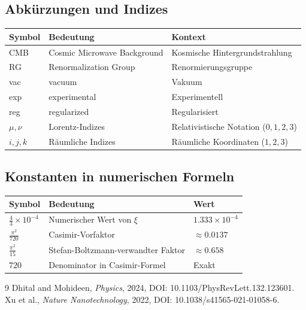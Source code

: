 	\subsection{Abkürzungen und Indizes}
	\begin{longtable}{>{\raggedright\arraybackslash}p{1.5cm} >{\raggedright\arraybackslash}p{6.5cm} >{\raggedright\arraybackslash}p{2.5cm}}
		\toprule
		\textbf{Symbol} & \textbf{Bedeutung} & \textbf{Kontext} \\
		\midrule
		CMB & Cosmic Microwave Background & Kosmische Hintergrundstrahlung \\
		RG & Renormalization Group & Renormierungsgruppe \\
		vac & vacuum & Vakuum \\
		exp & experimental & Experimentell \\
		reg & regularized & Regularisiert \\
		$\mu, \nu$ & Lorentz-Indizes & Relativistische Notation ($0,1,2,3$) \\
		$i, j, k$ & Räumliche Indizes & Räumliche Koordinaten ($1,2,3$) \\
		\bottomrule
	\end{longtable}
	
	\subsection{Konstanten in numerischen Formeln}
	\begin{longtable}{>{\raggedright\arraybackslash}p{1.5cm} >{\raggedright\arraybackslash}p{6.5cm} >{\raggedright\arraybackslash}p{2.5cm}}
		\toprule
		\textbf{Symbol} & \textbf{Bedeutung} & \textbf{Wert} \\
		\midrule
		$\frac{4}{3} \times 10^{-4}$ & Numerischer Wert von $\xi$ & $1.333 \times 10^{-4}$ \\
		$\frac{\pi^2}{720}$ & Casimir-Vorfaktor & $\approx 0.0137$ \\
		$\frac{\pi^2}{15}$ & Stefan-Boltzmann-verwandter Faktor & $\approx 0.658$ \\
		$720$ & Denominator in Casimir-Formel & Exakt \\
		\bottomrule
	\end{longtable}
	
	
		\begin{thebibliography}{9}
		Dhital and Mohideen, \emph{Physics}, 2024, DOI: 10.1103/PhysRevLett.132.123601.
		Xu et al., \emph{Nature Nanotechnology}, 2022, DOI: 10.1038/s41565-021-01058-6.
	\end{thebibliography}